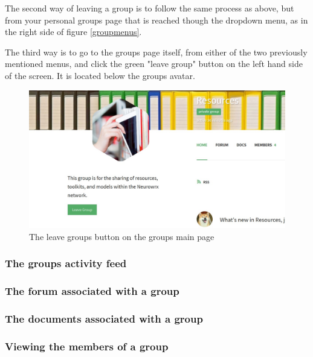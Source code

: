 \documentclass[10pt]{article}
\begin{document}
\begin{flushleft}
The second way of leaving a group is to follow the same process as above, but from your personal groups page that is reached though the dropdown menu, as in the right side of figure \ref{groupmenus}.
\end{flushleft}

\begin{flushleft}
The third way is to go to the groups page itself, from either of the two previously mentioned menus, and click the green "leave group" button on the left hand side of the screen.  It is located below the groups avatar.  
\end{flushleft}

\begin{figure}[h]
    \centering
    \includegraphics[scale=0.3]{images/leavegroup.jpg}
    \caption{The leave groups button on the groups main page}
    \label{leavegroup}
\end{figure}

\subsubsection{The groups activity feed}
\subsubsection{The forum associated with a group}
\subsubsection{The documents associated with a group}
\subsubsection{Viewing the members of a group}
\end{document}
